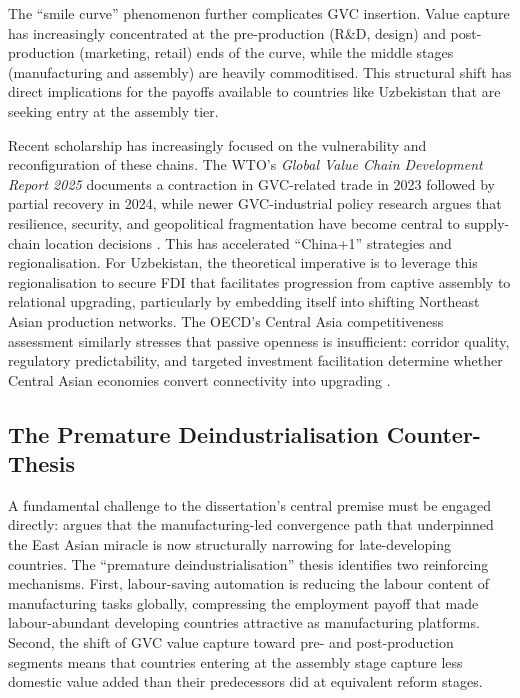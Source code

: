 The ``smile curve'' phenomenon \citep{baldwin2016} further complicates GVC insertion. Value capture has increasingly concentrated at the pre-production (R\&D, design) and post-production (marketing, retail) ends of the curve, while the middle stages (manufacturing and assembly) are heavily commoditised. This structural shift has direct implications for the payoffs available to countries like Uzbekistan that are seeking entry at the assembly tier.

Recent scholarship has increasingly focused on the vulnerability and reconfiguration of these chains. The WTO's \textit{Global Value Chain Development Report 2025} documents a contraction in GVC-related trade in 2023 followed by partial recovery in 2024, while newer GVC-industrial policy research argues that resilience, security, and geopolitical fragmentation have become central to supply-chain location decisions \citep{wto2025gvc, gereffi2025industrialpolicy}. This has accelerated ``China+1'' strategies and regionalisation. For Uzbekistan, the theoretical imperative is to leverage this regionalisation to secure FDI that facilitates progression from captive assembly to relational upgrading, particularly by embedding itself into shifting Northeast Asian production networks. The OECD's Central Asia competitiveness assessment similarly stresses that passive openness is insufficient: corridor quality, regulatory predictability, and targeted investment facilitation determine whether Central Asian economies convert connectivity into upgrading \citep{oecd2023centralasia}.

\subsection{The Premature Deindustrialisation Counter-Thesis}

A fundamental challenge to the dissertation's central premise must be engaged directly: \citet{rodrik2016} argues that the manufacturing-led convergence path that underpinned the East Asian miracle is now structurally narrowing for late-developing countries. The ``premature deindustrialisation'' thesis identifies two reinforcing mechanisms. First, labour-saving automation is reducing the labour content of manufacturing tasks globally, compressing the employment payoff that made labour-abundant developing countries attractive as manufacturing platforms. Second, the shift of GVC value capture toward pre- and post-production segments means that countries entering at the assembly stage capture less domestic value added than their predecessors did at equivalent reform stages.

